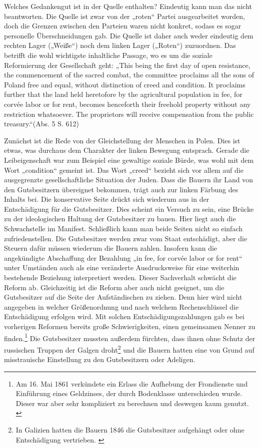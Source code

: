 \documentclass[12pt,headsepline,a4paper]{scrartcl}
\begin{document}
Welches Gedankengut ist in der Quelle enthalten? Eindeutig kann man das nicht beantworten. Die
Quelle ist zwar von der „roten“ Partei ausgearbeitet worden, doch die Grenzen zwischen den
Parteien waren nicht konkret, sodass es sogar personelle Überschneidungen gab.\autocite[19]{kowalski1954} Die Quelle ist
daher auch weder eindeutig dem rechten Lager („Weiße“) noch dem linken Lager („Roten“)
zuzuordnen. Das betrifft die wohl wichtigste inhaltliche Passage, wo es um die soziale
Reformierung der Gesellschaft geht: „This being the first day of open resistance, the
commencement of the sacred combat, the committee proclaims all the sons of Poland free and
equal, without distinction of creed and condition. It proclaims further that the land held heretofore
by the agricultural population in fee, for corvée labor or for rent, becomes henceforth their freehold
property without any restriction whatsoever. The proprietors will receive compensation from the
public treasury.“(Abs. 5 S. 612)

Zunächst ist die Rede von der Gleichstellung der Menschen in Polen. Dies ist etwas, was durchaus
dem Charakter der linken Bewegung entsprach. Gerade die Leibeigenschaft war zum Beispiel eine
gewaltige soziale Bürde, was wohl mit dem Wort „condition“ gemeint ist. Das Wort „creed“ bezieht
sich vor allem auf die ausgegrenzte gesellschaftliche Situation der Juden. Dass die Bauern ihr Land
von den Gutsbesitzern übereignet bekommen, trägt auch zur linken Färbung des Inhalts bei. Die
konservative Seite drückt sich wiederum aus in der Entschädigung für die Gutsbesitzer. Dies scheint
ein Versuch zu sein, eine Brücke zu der ideologischen Haltung der Gutsbesitzer zu bauen. Hier liegt
auch die Schwachstelle im Manifest. Schließlich kann man beide Seiten nicht so einfach
zufriedenstellen. Die Gutsbesitzer werden zwar vom Staat entschädigt, aber die Steuern dafür
müssen wiederum die Bauern zahlen. Insofern kann die angekündigte Abschaffung der Bezahlung
„in fee, for corvée labor or for rent“ unter Umständen auch als eine veränderte Ausdrucksweise für
eine weiterhin bestehende Beziehung interpretiert werden. Dieser Sachverhalt schwächt die Reform
ab. Gleichzeitig ist die Reform aber auch nicht geeignet, um die Gutsbesitzer auf die Seite der
Aufständischen zu ziehen. Denn hier wird nicht angegeben in welcher Größenordnung und nach
welchem Rechenschlüssel die Entschädigung erfolgen wird. Mit solchen Entschädigungszahlungen
gab es bei vorherigen Reformen bereits große Schwierigkeiten, einen gemeinsamen Nenner zu
finden.\footnote{
Am 16. Mai 1861 verkündete ein Erlass die Aufhebung der Frondienste und Einführung eines Geldzinses, der durch
Bodenklasse unterschieden wurde. Dieser war aber sehr kompliziert zu berechnen und deswegen kaum genutzt.
\autocite[82]{gentzen1958}}
Die Gutsbesitzer mussten außerdem fürchten, dass ihnen ohne Schutz der russischen
Truppen der Galgen droht\footnote{In Galizien hatten die Bauern 1846 die Gutsbesitzer aufgehängt oder ohne Entschädigung vertrieben.
\autocite[82]{gentzen1958}} 
und die Bauern hatten eine von Grund auf misstrauische Einstellung zu
den Gutsbesitzern oder Adeligen.\autocite[4]{kowalski1954}
\end{document}
